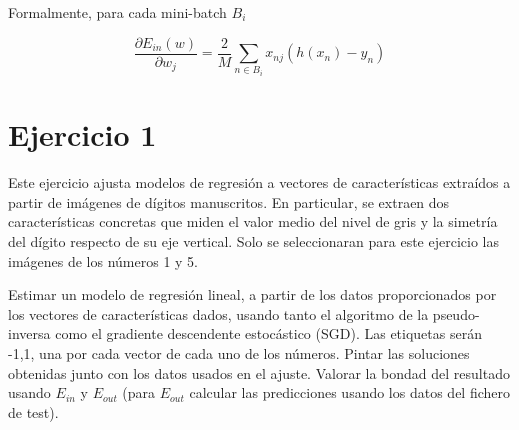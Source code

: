 Formalmente, para cada mini-batch $B_i$ 

\begin{equation*}
  \frac{\partial E_{in}(w)}{\partial w_j} = \frac{2}{M} \sum_{n \in B_i} x_{nj} (h(x_n) - y_n)
\end{equation*}

\section{Ejercicio 1}

Este ejercicio ajusta modelos de regresión a vectores de características
extraídos a partir de imágenes de dígitos manuscritos. En particular, se
extraen dos características concretas que miden el valor medio del nivel de
gris y la simetría del dígito respecto de su eje vertical. Solo se
seleccionaran para este ejercicio las imágenes de los números 1 y 5.

Estimar un modelo de regresión lineal, a partir de los datos proporcionados
por los vectores de características dados, usando tanto el algoritmo de la
pseudo-inversa como el gradiente descendente estocástico (SGD). Las etiquetas
serán {-1,1}, una por cada vector de cada uno de los números. Pintar las
soluciones obtenidas junto con los datos usados en el ajuste. Valorar la
bondad del resultado usando $E_{in}$ y $E_{out}$ (para $E_{out}$ calcular las
predicciones usando los datos del fichero de test).
